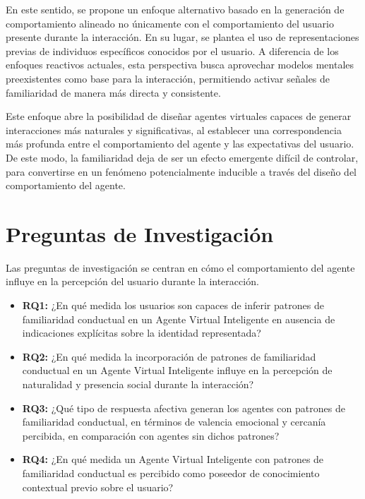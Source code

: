 \documentclass[12pt]{article}
\begin{document}
En este sentido, se propone un enfoque alternativo basado en la generación de comportamiento alineado no únicamente con el comportamiento del usuario presente durante la interacción. En su lugar, se plantea el uso de representaciones previas de individuos específicos conocidos por el usuario. A diferencia de los enfoques reactivos actuales, esta perspectiva busca aprovechar modelos mentales preexistentes como base para la interacción, permitiendo activar señales de familiaridad de manera más directa y consistente.

Este enfoque abre la posibilidad de diseñar agentes virtuales capaces de generar interacciones más naturales y significativas, al establecer una correspondencia más profunda entre el comportamiento del agente y las expectativas del usuario. De este modo, la familiaridad deja de ser un efecto emergente difícil de controlar, para convertirse en un fenómeno potencialmente inducible a través del diseño del comportamiento del agente.






\section{Preguntas de Investigación}

Las preguntas de investigación se centran en cómo el comportamiento del agente influye en la percepción del usuario durante la interacción.

\begin{itemize}

  \item \textbf{RQ1:} ¿En qué medida los usuarios son capaces de inferir patrones de familiaridad conductual en un Agente Virtual Inteligente en ausencia de indicaciones explícitas sobre la identidad representada?


  \item \textbf{RQ2:} ¿En qué medida la incorporación de patrones de familiaridad conductual en un Agente Virtual Inteligente influye en la percepción de naturalidad y presencia social durante la interacción?


  \item \textbf{RQ3:} ¿Qué tipo de respuesta afectiva generan los agentes con patrones de familiaridad conductual, en términos de valencia emocional y cercanía percibida, en comparación con agentes sin dichos patrones?


  \item \textbf{RQ4:} ¿En qué medida un Agente Virtual Inteligente con patrones de familiaridad conductual es percibido como poseedor de conocimiento contextual previo sobre el usuario?

\end{itemize}
\end{document}
